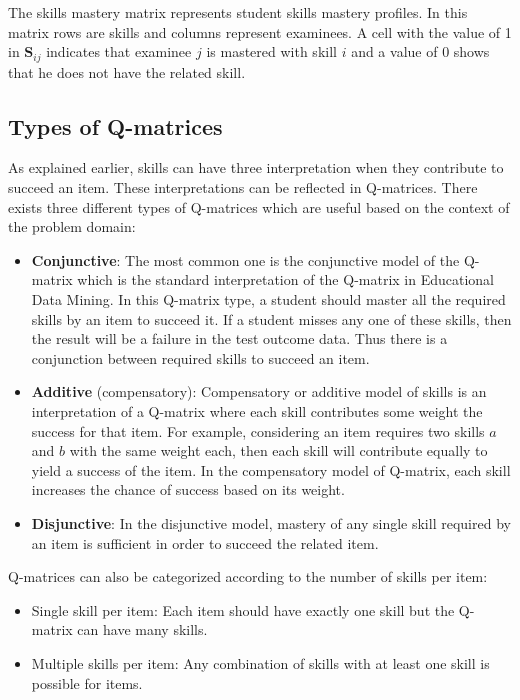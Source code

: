 The skills mastery matrix represents student skills mastery profiles. In this matrix rows are skills and columns represent examinees. A cell with the value of 1 in $\mathbf{S}_{ij}$ indicates that examinee $j$ is mastered with skill $i$ and a value of 0 shows that he does not have the related skill.

\subsection{Types of Q-matrices}
 
As explained earlier, skills can have three interpretation when they contribute to succeed an item. These interpretations can be reflected in Q-matrices. There exists three different types of Q-matrices which are useful based on the context of the problem domain:

\begin{itemize}
\item \textbf{Conjunctive}: The most common one is the conjunctive model of the Q-matrix which is the standard interpretation of the Q-matrix in Educational Data Mining. In this Q-matrix type, a student should master all the required skills by an item to succeed it. If a student misses any one of these skills, then the result will be a failure in the test outcome data. Thus there is a conjunction between required skills to succeed an item.

\item \textbf{Additive} (compensatory): Compensatory or additive model of skills is an interpretation of a Q-matrix where each skill contributes some weight the success for that item. For example, considering an item requires two skills $a$ and $b$ with the same weight each, then each skill will contribute equally to yield a success of the item. In the compensatory model of Q-matrix, each skill increases the chance of success based on its weight.

\item \textbf{Disjunctive}: In the disjunctive model, mastery of any single skill required by an item is sufficient in order to succeed the related item.
\end{itemize}

Q-matrices can also be categorized according to the number of skills per item:
\begin{itemize}
\item Single skill per item: Each item should have exactly one skill but the Q-matrix can have many skills.
\item Multiple skills per item: Any combination of skills with at least one skill is possible for items.
\end{itemize}

